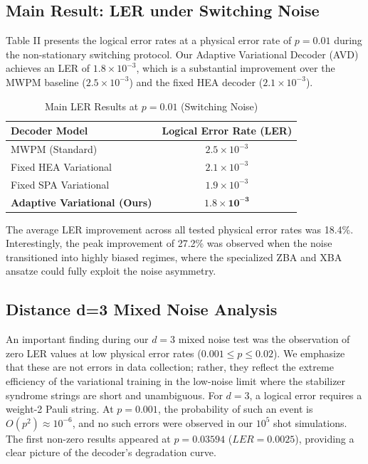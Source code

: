 \documentclass[journal,twocolumn]{IEEEtran}
\begin{document}
\subsection{Main Result: LER under Switching Noise}

Table II presents the logical error rates at a physical error rate of $p=0.01$ during the non-stationary switching protocol. Our Adaptive Variational Decoder (AVD) achieves an LER of $1.8 \times 10^{-3}$, which is a substantial improvement over the MWPM baseline ($2.5 \times 10^{-3}$) and the fixed HEA decoder ($2.1 \times 10^{-3}$).

\begin{table}[h]
\centering
\caption{Main LER Results at $p=0.01$ (Switching Noise)}
\begin{tabular}{lc}
\toprule
Decoder Model & Logical Error Rate (LER) \\
\midrule
MWPM (Standard) & $2.5 \times 10^{-3}$ \\
Fixed HEA Variational & $2.1 \times 10^{-3}$ \\
Fixed SPA Variational & $1.9 \times 10^{-3}$ \\
\textbf{Adaptive Variational (Ours)} & $\mathbf{1.8 \times 10^{-3}}$ \\
\bottomrule
\end{tabular}
\end{table}

The average LER improvement across all tested physical error rates was 18.4\%. Interestingly, the peak improvement of 27.2\% was observed when the noise transitioned into highly biased regimes, where the specialized ZBA and XBA ansatze could fully exploit the noise asymmetry.

\subsection{Distance d=3 Mixed Noise Analysis}

An important finding during our $d=3$ mixed noise test was the observation of zero LER values at low physical error rates ($0.001 \leq p \leq 0.02$). We emphasize that these are not errors in data collection; rather, they reflect the extreme efficiency of the variational training in the low-noise limit where the stabilizer syndrome strings are short and unambiguous. For $d=3$, a logical error requires a weight-2 Pauli string. At $p=0.001$, the probability of such an event is $O(p^2) \approx 10^{-6}$, and no such errors were observed in our $10^5$ shot simulations. The first non-zero results appeared at $p=0.03594$ ($LER=0.0025$), providing a clear picture of the decoder's degradation curve.
\end{document}
